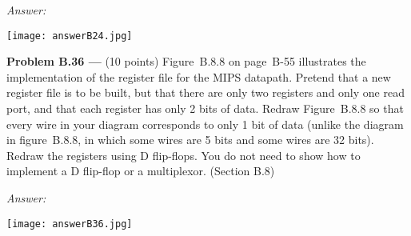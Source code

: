 \documentclass[11pt]{article}
\newcommand{\problem}[1]{\textbf{Problem #1 ---} }
\newcommand{\answer}{{\color{red}\textit{Answer: }}}
\begin{document}
\answer

\texttt{[image: answerB24.jpg]}

\newpage

\problem{B.36}(10 points) Figure~B.8.8 on page~B-55 illustrates the implementation of the register file for the MIPS datapath.  Pretend that a new register file is to be built, but that there are only two registers and only one read port, and that each register has only 2 bits of data.  Redraw Figure~B.8.8 so that every wire in your diagram corresponds to only 1 bit of data (unlike the diagram in figure~B.8.8, in which some wires are 5 bits and some wires are 32 bits).  Redraw the registers using D flip-flops.  You do not need to show how to implement a D flip-flop or a multiplexor. (Section B.8)

\answer

\texttt{[image: answerB36.jpg]}
\end{document}
